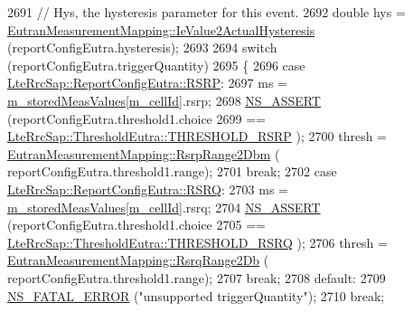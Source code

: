 \begin{DoxyCode}
2691         \textcolor{comment}{// Hys, the hysteresis parameter for this event.}
2692         \textcolor{keywordtype}{double} hys = \hyperlink{classns3_1_1EutranMeasurementMapping_ac0c6d0adbba21c8531600fed399f9f21}{EutranMeasurementMapping::IeValue2ActualHysteresis}
       (reportConfigEutra.hysteresis);
2693 
2694         \textcolor{keywordflow}{switch} (reportConfigEutra.triggerQuantity)
2695           \{
2696           \textcolor{keywordflow}{case} \hyperlink{structns3_1_1LteRrcSap_1_1ReportConfigEutra_a82343ddf526faba0483431ea5882a3efa5b7591e86ab7bcefc7fe1528762114d7}{LteRrcSap::ReportConfigEutra::RSRP}:
2697             ms = \hyperlink{classns3_1_1LteUeRrc_a93094dcd5c235b2e2a8a299125100a57}{m\_storedMeasValues}[\hyperlink{classns3_1_1LteUeRrc_aa9d3317734eea9158371d9fccf3a0c48}{m\_cellId}].rsrp;
2698             \hyperlink{assert_8h_a6dccdb0de9b252f60088ce281c49d052}{NS\_ASSERT} (reportConfigEutra.threshold1.choice
2699                        == \hyperlink{structns3_1_1LteRrcSap_1_1ThresholdEutra_ad3ed2704b836132980dd2e97cb03822ca0663d5baa9382bd755acb712f6ebf707}{LteRrcSap::ThresholdEutra::THRESHOLD\_RSRP}
      );
2700             thresh = \hyperlink{classns3_1_1EutranMeasurementMapping_a695a24d417b914a41b05a450cc1e1f9e}{EutranMeasurementMapping::RsrpRange2Dbm} (
      reportConfigEutra.threshold1.range);
2701             \textcolor{keywordflow}{break};
2702           \textcolor{keywordflow}{case} \hyperlink{structns3_1_1LteRrcSap_1_1ReportConfigEutra_a82343ddf526faba0483431ea5882a3efaa4e09cb3c7154d7ab732115a2647325f}{LteRrcSap::ReportConfigEutra::RSRQ}:
2703             ms = \hyperlink{classns3_1_1LteUeRrc_a93094dcd5c235b2e2a8a299125100a57}{m\_storedMeasValues}[\hyperlink{classns3_1_1LteUeRrc_aa9d3317734eea9158371d9fccf3a0c48}{m\_cellId}].rsrq;
2704             \hyperlink{assert_8h_a6dccdb0de9b252f60088ce281c49d052}{NS\_ASSERT} (reportConfigEutra.threshold1.choice
2705                        == \hyperlink{structns3_1_1LteRrcSap_1_1ThresholdEutra_ad3ed2704b836132980dd2e97cb03822ca6e8bda2b99825f09f53388c29b6402b4}{LteRrcSap::ThresholdEutra::THRESHOLD\_RSRQ}
      );
2706             thresh = \hyperlink{classns3_1_1EutranMeasurementMapping_a8c1e02fbc1226718eb0914cf13362147}{EutranMeasurementMapping::RsrqRange2Db} (
      reportConfigEutra.threshold1.range);
2707             \textcolor{keywordflow}{break};
2708           \textcolor{keywordflow}{default}:
2709             \hyperlink{group__fatal_ga5131d5e3f75d7d4cbfd706ac456fdc85}{NS\_FATAL\_ERROR} (\textcolor{stringliteral}{"unsupported triggerQuantity"});
2710             \textcolor{keywordflow}{break};

\end{DoxyCode}
